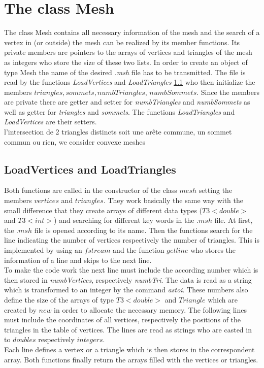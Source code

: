 \documentclass[10pt]{article}
\begin{document}
\section{The class Mesh} \label{mesh}
The class Mesh contains all necessary information of the mesh and the search of a vertex in (or outside) the mesh can be realized by its member functions. Its private members are pointers to the arrays of vertices and triangles of the mesh as integers who store the size of these two lists.
In order to create an object of type Mesh the name of the desired {\itshape .msh} file has to be transmitted. The file is read by the functions {\itshape LoadVertices} and {\itshape LoadTriangles} \ref{Load} who then initialize the members $ triangles, sommets, numbTriangles$, $numbSommets$.
Since the members are private there are getter and setter for {\itshape numbTriangles} and {\itshape numbSommets} as well as getter for {\itshape triangles} and {\itshape sommets}. The functions {\itshape LoadTriangles} and {\itshape LoadVertices} are their setters. \\

l’intersection de 2 triangles distincts soit une arête commune, un sommet commun ou rien, we consider convexe meshes


\subsection{LoadVertices and LoadTriangles} \label{Load}
Both functions are called in the constructor of the class $ mesh $ setting the members $  vertices$ and $ triangles $. 
They work basically the same way with the small difference that they create arrays of different data types ($ T3<double> $ and $ T3<int> $) and searching for different key words in the $ .msh $ file. 
At first, the $ .msh $ file is opened according to its name. Then the functions search for the line indicating the number of vertices respectively the number of triangles. This is implemented by using an $ fstream $ and the function $ getline $ who stores the information of a line and skips to the next line. \\
To make the code work the next line must include the according number which is then stored in {\itshape numbVertices}, respectively {\itshape numbTri}. The data is read as a string which is transformed to an integer by the command {\itshape astoi}. These numbers also define the size of the arrays of type $T3<double> $ and $ Triangle $ which are created by $ new $ in order to allocate the necessary memory. The following lines must include the coordinates of all vertices, respectively the positions of the triangles in the table of vertices. The lines are read as strings who are casted in to $ doubles $ respectively $ integers $. \\
Each line defines a vertex or a triangle which is then stores in the correspondent array.
Both functions finally return the arrays filled with the vertices or triangles.
\end{document}
